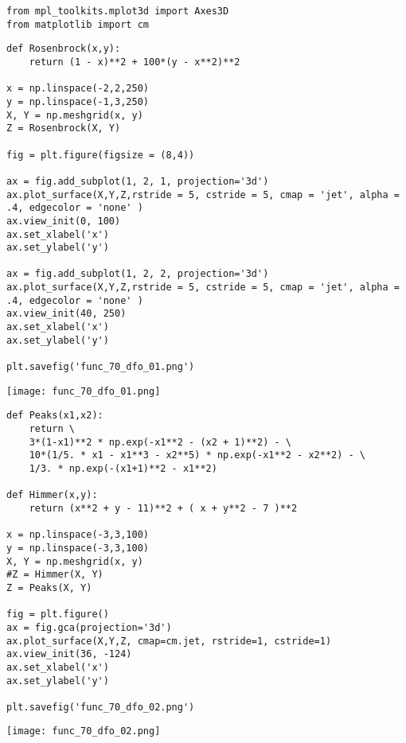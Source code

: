 
\begin{verbatim}
from mpl_toolkits.mplot3d import Axes3D
from matplotlib import cm
\end{verbatim}


\begin{verbatim}
def Rosenbrock(x,y):
    return (1 - x)**2 + 100*(y - x**2)**2

x = np.linspace(-2,2,250)
y = np.linspace(-1,3,250)
X, Y = np.meshgrid(x, y)
Z = Rosenbrock(X, Y)

fig = plt.figure(figsize = (8,4))

ax = fig.add_subplot(1, 2, 1, projection='3d')
ax.plot_surface(X,Y,Z,rstride = 5, cstride = 5, cmap = 'jet', alpha = .4, edgecolor = 'none' )
ax.view_init(0, 100)
ax.set_xlabel('x')
ax.set_ylabel('y')

ax = fig.add_subplot(1, 2, 2, projection='3d')
ax.plot_surface(X,Y,Z,rstride = 5, cstride = 5, cmap = 'jet', alpha = .4, edgecolor = 'none' )
ax.view_init(40, 250)
ax.set_xlabel('x')
ax.set_ylabel('y')

plt.savefig('func_70_dfo_01.png')
\end{verbatim}

\texttt{[image: func\_70\_dfo\_01.png]}

\begin{verbatim}
def Peaks(x1,x2):
    return \
    3*(1-x1)**2 * np.exp(-x1**2 - (x2 + 1)**2) - \
    10*(1/5. * x1 - x1**3 - x2**5) * np.exp(-x1**2 - x2**2) - \
    1/3. * np.exp(-(x1+1)**2 - x1**2)

def Himmer(x,y):
    return (x**2 + y - 11)**2 + ( x + y**2 - 7 )**2

x = np.linspace(-3,3,100)
y = np.linspace(-3,3,100)
X, Y = np.meshgrid(x, y)
#Z = Himmer(X, Y)
Z = Peaks(X, Y)

fig = plt.figure()
ax = fig.gca(projection='3d')
ax.plot_surface(X,Y,Z, cmap=cm.jet, rstride=1, cstride=1)
ax.view_init(36, -124)
ax.set_xlabel('x')
ax.set_ylabel('y')

plt.savefig('func_70_dfo_02.png')
\end{verbatim}

\texttt{[image: func\_70\_dfo\_02.png]}
